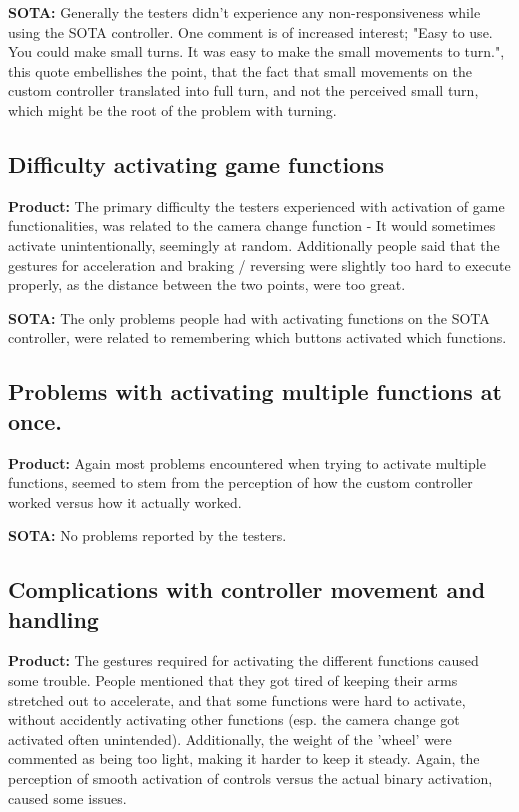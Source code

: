 \noindent\textbf{SOTA:}\newline
Generally the testers didn't experience any non-responsiveness while using the SOTA controller. One comment is of increased interest; "Easy to use. You could make small turns. It was easy to make the small movements to turn.", this quote embellishes the point, that the fact that small movements on the custom controller translated into full turn, and not the perceived small turn, which might be the root of the problem with turning.


\subsection*{Difficulty activating game functions}
\noindent\textbf{Product: }\newline
The primary difficulty the testers experienced with activation of game functionalities, was related to the camera change function - It would sometimes activate unintentionally, seemingly at random. Additionally people said that the gestures for acceleration and braking / reversing were slightly too hard to execute properly, as the distance between the two points, were too great.
\bigskip

\noindent\textbf{SOTA:}\newline
The only problems people had with activating functions on the SOTA controller, were related to remembering which buttons activated which functions.


\subsection*{Problems with activating multiple functions at once.}
\noindent\textbf{Product: }\newline
Again most problems encountered when trying to activate multiple functions, seemed to stem from the perception of how the custom controller worked versus how it actually worked.
\bigskip

\noindent\textbf{SOTA:}\newline
No problems reported by the testers.


\subsection*{Complications with controller movement and handling}
\noindent\textbf{Product: }\newline
The gestures required for activating the different functions caused some trouble. People mentioned that they got tired of keeping their arms stretched out to accelerate, and that some functions were hard to activate, without accidently activating other functions (esp. the camera change got activated often unintended). Additionally, the weight of the 'wheel' were commented as being too light, making it harder to keep it steady. Again, the perception of smooth activation of controls versus the actual binary activation, caused some issues.
\bigskip

